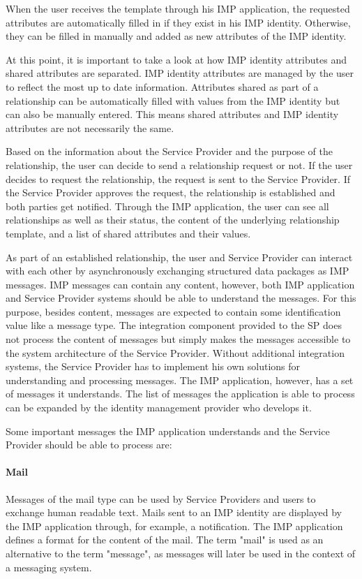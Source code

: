 When the user receives the template through his IMP application, the requested attributes are automatically filled in if they exist in his IMP identity. Otherwise, they can be filled in manually and added as new attributes of the IMP identity.

At this point, it is important to take a look at how IMP identity attributes and shared attributes are separated. IMP identity attributes are managed by the user to reflect the most up to date information. Attributes shared as part of a relationship can be automatically filled with values from the IMP identity but can also be manually entered. This means shared attributes and IMP identity attributes are not necessarily the same. 

Based on the information about the Service Provider and the purpose of the relationship, the user can decide to send a relationship request or not. If the user decides to request the relationship, the request is sent to the Service Provider. If the Service Provider approves the request, the relationship is established and both parties get notified. Through the IMP application, the user can see all relationships as well as their status, the content of the underlying relationship template, and a list of shared attributes and their values.

As part of an established relationship, the user and Service Provider can interact with each other by asynchronously exchanging structured data packages as IMP messages. IMP messages can contain any content, however, both IMP application and Service Provider systems should be able to understand the messages. For this purpose, besides content, messages are expected to contain some identification value like a message type. The integration component provided to the SP does not process the content of messages but simply makes the messages accessible to the system architecture of the Service Provider. Without additional integration systems, the Service Provider has to implement his own solutions for understanding and processing messages. The IMP application, however, has a set of messages it understands. The list of messages the application is able to process can be expanded by the identity management provider who develops it.

Some important messages the IMP application understands and the Service Provider should be able to process are:

\paragraph{Mail} Messages of the mail type can be used by Service Providers and users to exchange human readable text. Mails sent to an IMP identity are displayed by the IMP application through, for example, a notification. 
The IMP application defines a format for the content of the mail. The term "mail" is used as an alternative to the term "message", as messages will later be used in the context of a messaging system.

